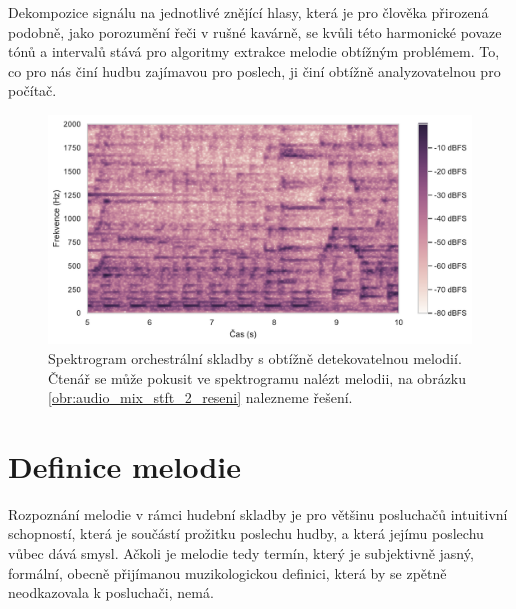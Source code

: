 Dekompozice signálu na jednotlivé znějící hlasy, která je pro člověka přirozená podobně, jako porozumění řeči v rušné kavárně, se kvůli této harmonické povaze tónů a intervalů stává pro algoritmy extrakce melodie obtížným problémem. To, co pro nás činí hudbu zajímavou pro poslech, ji činí obtížně analyzovatelnou pro počítač.




\begin{figure}[h]\centering
\includegraphics[width=\textwidth,height=\textheight,keepaspectratio]{../img/audio_mix_stft_2}
\caption{Spektrogram orchestrální skladby s obtížně detekovatelnou melodií. Čtenář se může pokusit ve spektrogramu nalézt melodii, na obrázku \ref{obr:audio_mix_stft_2_reseni} nalezneme řešení.}
\label{obr:audio_mix_stft_2}
\end{figure}

\section{Definice melodie}

Rozpoznání melodie v rámci hudební skladby je pro většinu posluchačů intuitivní schopností, která je součástí prožitku poslechu hudby, a která jejímu poslechu vůbec dává smysl. Ačkoli je melodie tedy termín, který je subjektivně jasný, formální, obecně přijímanou muzikologickou definici, která by se zpětně neodkazovala k posluchači, nemá. 

